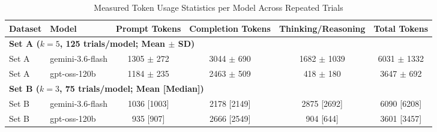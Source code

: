\begin{table}[t]
\centering
\caption{Measured Token Usage Statistics per Model Across Repeated Trials}
\label{tab:token_usage}
\begin{tabular}{llcccc}
\toprule
\textbf{Dataset} & \textbf{Model} & \textbf{Prompt Tokens} & \textbf{Completion Tokens} & \textbf{Thinking/Reasoning} & \textbf{Total Tokens} \\
\midrule
\multicolumn{6}{l}{\textbf{Set A ($k=5$, 125 trials/model; Mean $\pm$ SD)}} \\
\midrule
Set A & gemini-3.6-flash & 1305 $\pm$ 272 & 3044 $\pm$ 690 & 1682 $\pm$ 1039 & 6031 $\pm$ 1332 \\
Set A & gpt-oss-120b & 1184 $\pm$ 235 & 2463 $\pm$ 509 & 418 $\pm$ 180 & 3647 $\pm$ 692 \\
\midrule
\multicolumn{6}{l}{\textbf{Set B ($k=3$, 75 trials/model; Mean [Median])}} \\
\midrule
Set B & gemini-3.6-flash & 1036 [1003] & 2178 [2149] & 2875 [2692] & 6090 [6208] \\
Set B & gpt-oss-120b & 935 [907] & 2666 [2549] & 904 [644] & 3601 [3457] \\
\bottomrule
\end{tabular}
\end{table}
